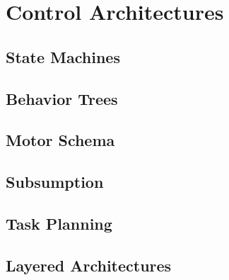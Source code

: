 \chapter{Control Architectures}

\section{State Machines}

\section{Behavior Trees}

\section{Motor Schema}

\section{Subsumption}

\section{Task Planning}

\section{Layered Architectures}

